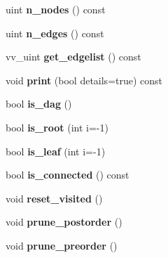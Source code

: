 \begin{DoxyCompactItemize}
\item 
uint {\bfseries n\+\_\+nodes} () const \hypertarget{classTree_a69612e5a3a479c16d12b661e6bac4062}{}\label{classTree_a69612e5a3a479c16d12b661e6bac4062}

\item 
uint {\bfseries n\+\_\+edges} () const \hypertarget{classTree_a055847ae7ad6387a32113a1fe24ca61b}{}\label{classTree_a055847ae7ad6387a32113a1fe24ca61b}

\item 
vv\+\_\+uint {\bfseries get\+\_\+edgelist} () const \hypertarget{classTree_a700fd8abdcb805f53999b2fb00fc2710}{}\label{classTree_a700fd8abdcb805f53999b2fb00fc2710}

\item 
void {\bfseries print} (bool details=true) const \hypertarget{classTree_afe757ac173ac177a0ebefd222a06eed5}{}\label{classTree_afe757ac173ac177a0ebefd222a06eed5}

\item 
bool {\bfseries is\+\_\+dag} ()\hypertarget{classTree_af793b391043a88ceea805b584efb982a}{}\label{classTree_af793b391043a88ceea805b584efb982a}

\item 
bool {\bfseries is\+\_\+root} (int i=-\/1)\hypertarget{classTree_ac7cc72373de46f73b747206d025854c0}{}\label{classTree_ac7cc72373de46f73b747206d025854c0}

\item 
bool {\bfseries is\+\_\+leaf} (int i=-\/1)\hypertarget{classTree_a47c36d92497bd98860e17937def7620c}{}\label{classTree_a47c36d92497bd98860e17937def7620c}

\item 
bool {\bfseries is\+\_\+connected} () const \hypertarget{classTree_a9f911acd648bbae87eaa018e61289903}{}\label{classTree_a9f911acd648bbae87eaa018e61289903}

\item 
void {\bfseries reset\+\_\+visited} ()\hypertarget{classTree_adb83bb19c14623ce57ac6d1b84b1c2ff}{}\label{classTree_adb83bb19c14623ce57ac6d1b84b1c2ff}

\item 
void {\bfseries prune\+\_\+postorder} ()\hypertarget{classTree_a7d465880d18acf79f3a772ea5412b0d7}{}\label{classTree_a7d465880d18acf79f3a772ea5412b0d7}

\item 
void {\bfseries prune\+\_\+preorder} ()\hypertarget{classTree_ac85bfb083b3856e65987e1d15885a61c}{}\label{classTree_ac85bfb083b3856e65987e1d15885a61c}

\end{DoxyCompactItemize}
